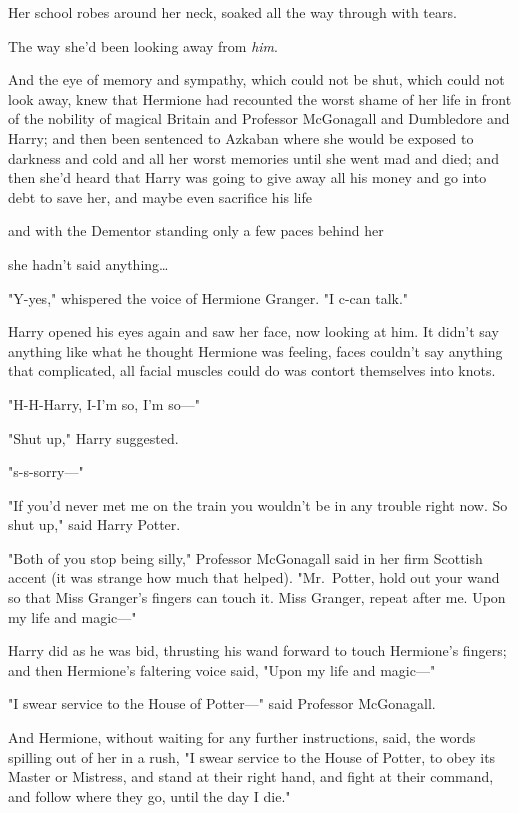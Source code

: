 Her school robes around her neck, soaked all the way through with tears.

The way she'd been looking away from \emph{him}.

And the eye of memory and sympathy, which could not be shut, which could not 
look away, knew that Hermione had recounted the worst shame of her life in 
front of the nobility of magical Britain and Professor McGonagall and 
Dumbledore and Harry; and then been sentenced to Azkaban where she would be 
exposed to darkness and cold and all her worst memories until she went mad and 
died; and then she'd heard that Harry was going to give away all his money and 
go into debt to save her, and maybe even sacrifice his life

and with the Dementor standing only a few paces behind her

she hadn't said anything{\ldots}

"Y-yes," whispered the voice of Hermione Granger. "I c-can talk."

Harry opened his eyes again and saw her face, now looking at him. It didn't say 
anything like what he thought Hermione was feeling, faces couldn't say anything 
that complicated, all facial muscles could do was contort themselves into knots.

"H-H-Harry, I-I'm so, I'm so---"

"Shut up," Harry suggested.

"s-s-sorry---"

"If you'd never met me on the train you wouldn't be in any trouble right now. 
So shut up," said Harry Potter.

"Both of you stop being silly," Professor McGonagall said in her firm Scottish 
accent (it was strange how much that helped). "Mr.~Potter, hold out your wand 
so that Miss Granger's fingers can touch it. Miss Granger, repeat after me. 
Upon my life and magic---"

Harry did as he was bid, thrusting his wand forward to touch Hermione's 
fingers; and then Hermione's faltering voice said, "Upon my life and magic---"

"I swear service to the House of Potter---" said Professor McGonagall.

And Hermione, without waiting for any further instructions, said, the words 
spilling out of her in a rush, "I swear service to the House of Potter, to obey 
its Master or Mistress, and stand at their right hand, and fight at their 
command, and follow where they go, until the day I die."

